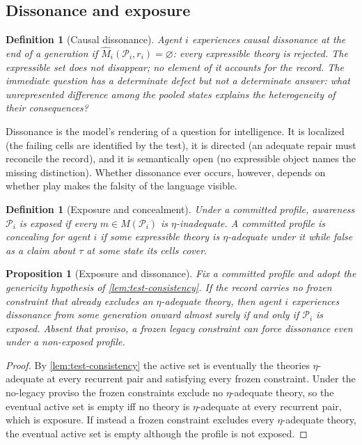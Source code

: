 \documentclass[11pt]{article}
\newtheorem{definition}[assumption]{Definition}
\newtheorem{proposition}[assumption]{Proposition}
\theoremstyle{definition}
\newcommand{\emptysetset}{\varnothing}
\begin{document}
\subsection{Dissonance and exposure}

\begin{definition}[Causal dissonance]
\label{def:dissonance}
Agent $i$ experiences \emph{causal dissonance} at the end of a generation if
$\widehat M_i(\mathcal P_i,r_i)=\emptysetset$: every expressible theory is
rejected.  The expressible set does not disappear; no element of it accounts
for the record.  The immediate question has a determinate defect but not a
determinate answer: \emph{what unrepresented difference among the pooled
states explains the heterogeneity of their consequences?}
\end{definition}

Dissonance is the model's rendering of a question for intelligence.  It is
localized (the failing cells are identified by the test), it is directed (an
adequate repair must reconcile the record), and it is semantically open (no
expressible object names the missing distinction).  Whether dissonance ever
occurs, however, depends on whether play makes the falsity of the language
visible.

\begin{definition}[Exposure and concealment]
\label{def:exposure}
Under a committed profile, awareness $\mathcal P_i$ is \emph{exposed} if
every $m\in M(\mathcal P_i)$ is $\eta$-inadequate.  A committed profile is
\emph{concealing} for agent $i$ if some expressible theory is
$\eta$-adequate under it while false as a claim about $\tau$ at some state
its cells cover.
\end{definition}

\begin{proposition}[Exposure and dissonance]
\label{prop:exposure}
Fix a committed profile and adopt the genericity hypothesis of
\cref{lem:test-consistency}.  If the record carries no frozen constraint that
already excludes an $\eta$-adequate theory, then agent $i$ experiences
dissonance from some generation onward almost surely if and only if
$\mathcal P_i$ is exposed.  Absent that proviso, a frozen legacy constraint
can force dissonance even under a non-exposed profile.
\end{proposition}

\begin{proof}
By \cref{lem:test-consistency} the active set is eventually the theories
$\eta$-adequate at every recurrent pair and satisfying every frozen
constraint.  Under the no-legacy proviso the frozen constraints exclude no
$\eta$-adequate theory, so the eventual active set is empty iff no theory is
$\eta$-adequate at every recurrent pair, which is exposure.  If instead a
frozen constraint excludes every $\eta$-adequate theory, the eventual active
set is empty although the profile is not exposed.
\end{proof}
\end{document}
